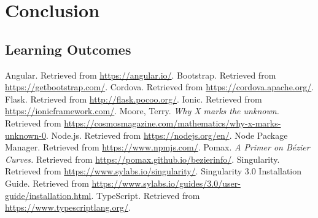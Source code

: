 \documentclass[12pt]{report}
\begin{document}
\chapter{Conclusion}
    \section{Learning Outcomes}

\begin{thebibliography}{9}
     Angular. Retrieved from \url{https://angular.io/}.
     Bootstrap. Retrieved from
        \url{https://getbootstrap.com/}.
     Cordova. Retrieved from \url{https://cordova.apache.org/}.
     Flask. Retrieved from \url{http://flask.pocoo.org/}.
     Ionic. Retrieved from \url{https://ionicframework.com/}.
     Moore, Terry. \textit{Why X marks the unknown.} Retrieved
        from \url{https://cosmosmagazine.com/mathematics/why-x-marks-unknown-0}.
     Node\@.js. Retrieved from \url{https://nodejs.org/en/}.
     Node Package Manager. Retrieved from \url{https://www.npmjs.com/}.
     Pomax. \textit{A Primer on Bézier Curves.} Retrieved from
        \url{https://pomax.github.io/bezierinfo/}.
     Singularity. Retrieved from \url{https://www.sylabs.io/singularity/}.
     Singularity 3\@.0 Installation Guide. Retrieved
        from
        \url{https://www.sylabs.io/guides/3.0/user-guide/installation.html}.
     TypeScript. Retrieved from
        \url{https://www.typescriptlang.org/}.
\end{thebibliography}
\end{document}
